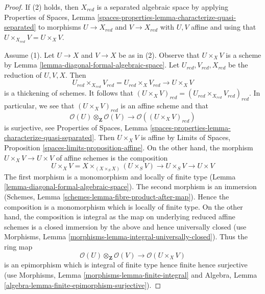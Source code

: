 \documentclass{stacks-project}
\theoremstyle{plain}
\theoremstyle{definition}
\theoremstyle{remark}
\numberwithin{equation}{subsection}
\begin{document}
\begin{proof}
If (2) holds, then $X_{red}$ is a separated algebraic space
by applying Properties of Spaces, Lemma
\ref{spaces-properties-lemma-characterize-quasi-separated}
to morphisms $U \to X_{red}$ and $V \to X_{red}$
with $U, V$ affine and using that $U \times_{X_{red}} V = U \times_X V$.

\medskip\noindent
Assume (1). Let $U \to X$ and $V \to X$ be as in (2).
Observe that $U \times_X V$ is a scheme by
Lemma \ref{lemma-diagonal-formal-algebraic-space}.
Let $U_{red}, V_{red}, X_{red}$ be the reduction of $U, V, X$.
Then
$$
U_{red} \times_{X_{red}} V_{red} = U_{red} \times_X V_{red} \to U \times_X V
$$
is a thickening of schemes. It follows that
$(U \times_X V)_{red} = (U_{red} \times_{X_{red}} V_{red})_{red}$.
In particular, we see that $(U \times_X V)_{red}$ is an affine scheme
and that
$$
\mathcal{O}(U) \otimes_\mathbf{Z} \mathcal{O}(V)
\longrightarrow
\mathcal{O}((U \times_X V)_{red})
$$
is surjective, see Properties of Spaces, Lemma
\ref{spaces-properties-lemma-characterize-quasi-separated}.
Then $U \times_X V$ is affine by
Limits of Spaces, Proposition \ref{spaces-limits-proposition-affine}.
On the other hand, the morphism $U \times_X V \to U \times V$
of affine schemes is the composition
$$
U \times_X V = X \times_{(X \times_S X)} (U \times_S V)
\to U \times_S V \to U \times V
$$
The first morphism is a monomorphism and locally of finite type
(Lemma \ref{lemma-diagonal-formal-algebraic-space}).
The second morphism is an immersion
(Schemes, Lemma \ref{schemes-lemma-fibre-product-after-map}).
Hence the composition is a monomorphism which is locally of finite type.
On the other hand, the composition is integral as the map on
underlying reduced affine schemes is a closed immersion
by the above and hence universally closed (use
Morphisms, Lemma \ref{morphisms-lemma-integral-universally-closed}).
Thus the ring map
$$
\mathcal{O}(U) \otimes_\mathbf{Z} \mathcal{O}(V)
\longrightarrow
\mathcal{O}(U \times_X V)
$$
is an epimorphism which is integral of finite type
hence finite hence surjective (use
Morphisms, Lemma \ref{morphisms-lemma-finite-integral}
and
Algebra, Lemma \ref{algebra-lemma-finite-epimorphism-surjective}).
\end{proof}
\end{document}
